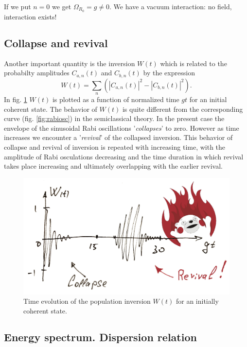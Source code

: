 \begin{testexample}
	If we put $n=0$ we get $\Omega_{R_0} = g \neq 0$. We have a vacuum interaction: no field, interaction exists!
\end{testexample}

\subsection{Collapse and revival}

Another important quantity is the inversion $W(t)$ which is related to the probabilty amplitudes $C_{a,n}(t)$ and $C_{b,n}(t)$ by the expression
\begin{equation}
	W(t) = \sum_{n} \left( \left| C_{a,n}(t) \right|^2 - \left| C_{b,n}(t) \right|^2 \right).
\end{equation}
In fig. \ref{fig:candr} $W(t)$ is plotted as a function of normalized time $g t$ for an initial coherent state. The behavior of $W(t)$ is quite different from the corresponding curve (fig. \ref{fig:rabiosc}) in the semiclassical theory. In the present case the envelope of the sinusoidal Rabi oscillations '\textit{collapses}' to zero. However as time increases we encounter a '\textit{revival}' of the collapsed inversion. This behavior of collapse and revival of inversion is repeated with increasing time, with the amplitude of Rabi osculations decreasing and the time duration in which revival takes place increasing and ultimately overlapping with the earlier revival.

\begin{figure}
	\centering
	\includegraphics[width=0.7\linewidth]{fig/L6/c_and_r.jpg}
	\caption{Time evolution of the population inversion $W(t)$ for an initially coherent state.}
	\label{fig:candr}
\end{figure}


\subsection{Energy spectrum. Dispersion relation}

